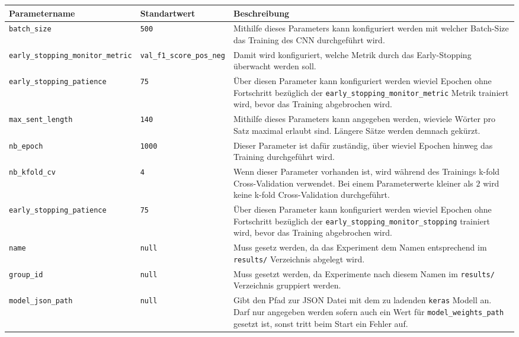 \begin{table}[H]
	\centering
	\begin{adjustbox}{max width=\textwidth, max height=\textheight}
		\begin{tabular}{llp{10cm}}
			\toprule
			Parametername & Standartwert & Beschreibung\\ \midrule
			\texttt{batch{\_}size} & \texttt{500} & Mithilfe dieses Parameters kann konfiguriert werden mit welcher Batch-Size das Training des CNN durchgeführt wird.\\
			\texttt{early{\_}stopping{\_}monitor{\_}metric} & \texttt{val{\_}f1{\_}score{\_}pos{\_}neg} & Damit wird konfiguriert, welche Metrik durch das Early-Stopping überwacht werden soll.\\
			\texttt{early{\_}stopping{\_}patience} & \texttt{75} & Über diesen Parameter kann konfiguriert werden wieviel Epochen ohne Fortschritt bezüglich der \texttt{early{\_}stopping{\_}monitor{\_}metric} Metrik trainiert wird, bevor das Training abgebrochen wird.\\
			\texttt{max{\_}sent{\_}length} & \texttt{140} & Mithilfe dieses Parameters kann angegeben werden, wieviele Wörter pro Satz maximal erlaubt sind. Längere Sätze werden demnach gekürzt.\\
			\texttt{nb{\_}epoch} & \texttt{1000} & Dieser Parameter ist dafür zuständig, über wieviel Epochen hinweg das Training durchgeführt wird.\\
			\texttt{nb{\_}kfold{\_}cv} & \texttt{4} & Wenn dieser Parameter vorhanden ist, wird während des Trainings k-fold Cross-Validation verwendet. Bei einem Parameterwerte kleiner als $2$ wird keine k-fold Cross-Validation durchgeführt.\\
			\texttt{early{\_}stopping{\_}patience} & \texttt{75} & Über diesen Parameter kann konfiguriert werden wieviel Epochen ohne Fortschritt bezüglich der \texttt{early{\_}stopping{\_}monitor{\_}stopping} trainiert wird, bevor das Training abgebrochen wird.\\
			\texttt{name} & \texttt{null} & Muss gesetz werden, da das Experiment dem Namen entsprechend im \texttt{results/} Verzeichnis abgelegt wird.\\
			\texttt{group{\_}id} & \texttt{null} & Muss gesetzt werden, da Experimente nach diesem Namen im \texttt{results/} Verzeichnis gruppiert werden.\\
			\texttt{model{\_}json{\_}path} & \texttt{null} & Gibt den Pfad zur JSON Datei mit dem zu ladenden \texttt{keras} Modell an. Darf nur angegeben werden sofern auch ein Wert für \texttt{model{\_}weights{\_}path} gesetzt ist, sonst tritt beim Start ein Fehler auf.\\

\end{tabular}
\end{adjustbox}
\end{table}
